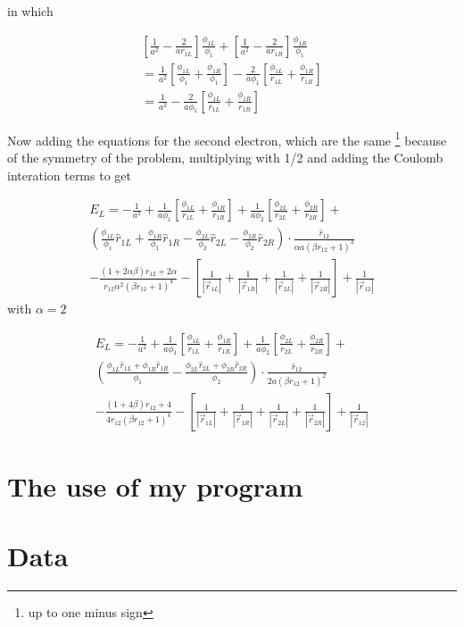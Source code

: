 \documentclass{article}
\begin{document}
in which 

\begin{multline}
   \left[\frac{1}{a^2}-\frac{2}{a{r}_{1L}} \right] \frac{\phi_{1L}}{\phi_1} + \left[\frac{1}{a^2} - \frac{2}{a{r}_{1R}} \right] \frac{\phi_{1R}}{\phi_1}   \\ = \frac{1}{a^2} \left[ \frac{\phi_{1L}}{\phi_1} + \frac{\phi_{1R}}{\phi_1} \right]-\frac{2}{a\phi_1}\left[ \frac{\phi_{1L}}{r_{1L}}+\frac{\phi_{1R}}{r_{1R}} \right] \\ = \frac{1}{a^2} -\frac{2}{a\phi_1}\left[ \frac{\phi_{1L}}{r_{1L}}+\frac{\phi_{1R}}{r_{1R}} \right]
\end{multline}

Now adding the equations for the second electron, which are the same \footnote{up to one minus sign} because of the symmetry of the problem, multiplying with 1/2 and adding the Coulomb interation terms to get

\begin{multline}%
 E_L = -\frac{1}{a^2} +\frac{1}{a\phi_1}\left[ \frac{\phi_{1L}}{r_{1L}}+\frac{\phi_{1R}}{r_{1R}} \right] + \frac{1}{a\phi_2} \left[ \frac{\phi_{2L}}{r_{2L}}+\frac{\phi_{2R}}{r_{2R}}\right]
 + \\ \left(  \frac{\phi_{1L}}{\phi_1}\hat{r}_{1L} +\frac{\phi_{1R}}{\phi_1}\hat{r}_{1R}   -   \frac{\phi_{2L}}{\phi_2}\hat{r}_{2L} -\frac{\phi_{2R}}{\phi_2}\hat{r}_{2R}     \right)  \cdot \frac{\hat{r}_{12}}{\alpha a(\beta r_{12}+1)^2} \\
  -   \frac{(1+2\alpha \beta) r_{12} + 2\alpha}{r_{12}\alpha^2(\beta r_{12}+1)^4} 
  - \left[ \frac{1}{|\vec{r}_{1L}|} +\frac{1}{|\vec{r}_{1R}|}+\frac{1}{|\vec{r}_{2L}|}+\frac{1}{|\vec{r}_{2R}|} \right] +\frac{1}{\left| \vec{r}_{12} \right|} 
\end{multline}
with $\alpha=2$


 \begin{multline}
 E_L = -\frac{1}{a^2} + \frac{1}{a\phi_1}\left[ \frac{\phi_{1L}}{r_{1L}}+\frac{\phi_{1R}}{r_{1R}} \right] + \frac{1}{a\phi_2} \left[ \frac{\phi_{2L}}{r_{2L}}+\frac{\phi_{2R}}{r_{2R}}\right]
 + \\ \left(  \frac{\phi_{1L}\hat{r}_{1L}+\phi_{1R}\hat{r}_{1R}}{\phi_1}   -    \frac{\phi_{2L}\hat{r}_{2L}+\phi_{2R}\hat{r}_{2R}}{\phi_2}     \right) \cdot \frac{\hat{r}_{12}}{2 a(\beta r_{12}+1)^2} \\
  -   \frac{(1+4 \beta) r_{12} + 4}{4r_{12}(\beta r_{12}+1)^4} 
  - \left[ \frac{1}{|\vec{r}_{1L}|} +\frac{1}{|\vec{r}_{1R}|}+\frac{1}{|\vec{r}_{2L}|}+\frac{1}{|\vec{r}_{2R}|} \right] +\frac{1}{\left| \vec{r}_{12} \right|} 
\end{multline}





\section{The use of my program}


\section{Data}
\end{document}
